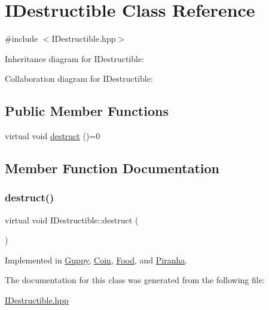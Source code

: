 \hypertarget{class_i_destructible}{}\section{I\+Destructible Class Reference}
\label{class_i_destructible}


{\ttfamily \#include $<$I\+Destructible.\+hpp$>$}



Inheritance diagram for I\+Destructible\+:


Collaboration diagram for I\+Destructible\+:
\subsection*{Public Member Functions}
\begin{DoxyCompactItemize}
\item 
virtual void \mbox{\hyperlink{class_i_destructible_a63016d1bb4daa0a726fc8add9a0be62d}{destruct}} ()=0
\end{DoxyCompactItemize}


\subsection{Member Function Documentation}
\mbox{\label{class_i_destructible_a63016d1bb4daa0a726fc8add9a0be62d}} 
\subsubsection{\texorpdfstring{destruct()}{destruct()}}
{\footnotesize\ttfamily virtual void I\+Destructible\+::destruct (\begin{DoxyParamCaption}{ }\end{DoxyParamCaption})\hspace{0.3cm}{\ttfamily [pure virtual]}}



Implemented in \mbox{\hyperlink{class_guppy_a26bc11223497fef2ae795283a5682407}{Guppy}}, \mbox{\hyperlink{class_coin_a16c42ef0d21f50bb08d4099d82b4ed57}{Coin}}, \mbox{\hyperlink{class_food_a5e1bfe34f8a4f4ce60accc57212c95c8}{Food}}, and \mbox{\hyperlink{class_piranha_a79c586a13bed4fb4aaa1b99c41c93c5a}{Piranha}}.



The documentation for this class was generated from the following file\+:\begin{DoxyCompactItemize}
\item 
\mbox{\hyperlink{_i_destructible_8hpp}{I\+Destructible.\+hpp}}\end{DoxyCompactItemize}
